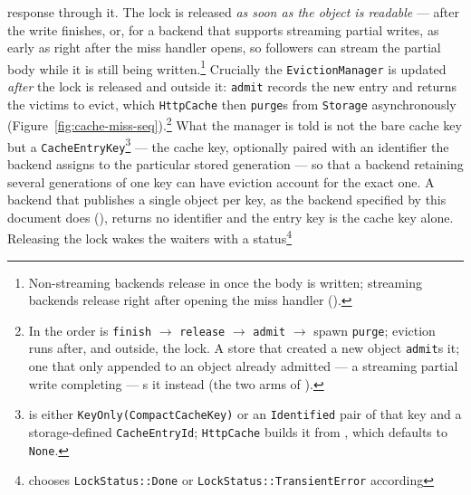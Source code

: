 \begin{itemize}
    response through it. The lock is released \emph{as soon as the object is readable} --- after
    the write finishes, or, for a backend that supports streaming partial writes, as
    early as right after the miss handler opens, so followers can stream the partial
    body while it is still being
    written.\footnote{Non-streaming backends release in
       once the
      body is written; streaming backends release right after opening the miss
      handler ().}
    Crucially the \texttt{EvictionManager} is
    updated \emph{after} the lock is released and outside it: \texttt{admit} records the
    new entry and returns the victims to evict, which \texttt{HttpCache} then
    \texttt{purge}s from \texttt{Storage} asynchronously
    (Figure~\ref{fig:cache-miss-seq}).\footnote{In
       the order
      is \texttt{finish} $\rightarrow$ \texttt{release} $\rightarrow$ \texttt{admit}
      $\rightarrow$ spawn \texttt{purge}; eviction runs after, and outside, the lock.
      A store that created a new object \texttt{admit}s it; one that only appended to
      an object already admitted --- a streaming partial write completing ---
      s it instead
      (the two arms of ).}
    What the manager is told is not the bare cache key but a
    \texttt{CacheEntryKey}\footnote{
      is either \texttt{KeyOnly(CompactCacheKey)} or an \texttt{Identified} pair of
      that key and a storage-defined \texttt{CacheEntryId}; \texttt{HttpCache} builds
      it from ,
      which defaults to \texttt{None}.} --- the cache key, optionally paired with an
    identifier the backend assigns to the particular stored generation --- so that a
    backend retaining several generations of one key can have eviction account for
    the exact one. A backend that publishes a single object per key, as the backend
    specified by this document does (), returns no
    identifier and the entry key is the cache key alone.
    Releasing the lock wakes the waiters with a
    status\footnote{
      chooses \texttt{LockStatus::Done} or \texttt{LockStatus::TransientError} according
}
\end{itemize}

